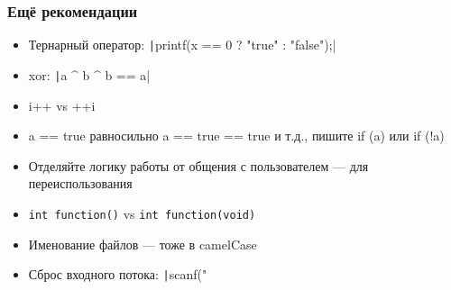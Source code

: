 \documentclass{../../slides-style}
\begin{document}
    \begin{frame}[fragile]
        \frametitle{Ещё рекомендации}
        \begin{itemize}
            \item Тернарный оператор: \texttt|printf(x == 0 ? "true" :  "false");|
            \item xor: \texttt|a ^ b ^ b == a|
            \item i++ vs ++i
            \item a == true равносильно a == true == true и т.д., пишите if (a) или if (!a)
            \item Отделяйте логику работы от общения с пользователем --- для переиспользования
            \item \texttt{int function()} vs \texttt{int function(void)}
            \item Именование файлов --- тоже в camelCase
            \item Сброс входного потока: \texttt|scanf("%
        \end{itemize}
    \end{frame}
\end{document}
